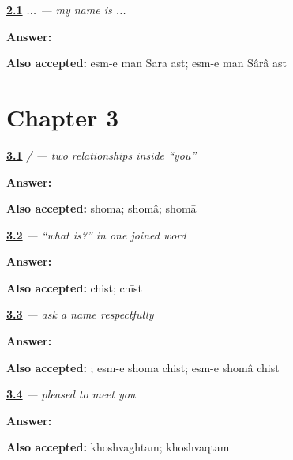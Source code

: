 \noindent\begin{minipage}[t]{\linewidth}
\raggedright
\hyperlink{review-FA-C02-esm-e-man-sara}{\textbf{2.1}} \emph{  ...  — my name is ...}\par
\small \textbf{Answer:}    \par
\footnotesize \textbf{Also accepted:} esm-e man Sara ast; esm-e man Sârâ ast
\end{minipage}\par\medskip

\section*{Chapter 3}

\noindent\begin{minipage}[t]{\linewidth}
\raggedright
\hyperlink{review-FA-C03-shoma-to-first-meeting}{\textbf{3.1}} \emph{ /  — two relationships inside “you”}\par
\small \textbf{Answer:} \par
\footnotesize \textbf{Also accepted:} shoma; shomâ; shomā
\end{minipage}\par\medskip

\noindent\begin{minipage}[t]{\linewidth}
\raggedright
\hyperlink{review-FA-C03-chist-fusion}{\textbf{3.2}} \emph{ — “what is?” in one joined word}\par
\small \textbf{Answer:} \par
\footnotesize \textbf{Also accepted:} chist; chīst
\end{minipage}\par\medskip

\noindent\begin{minipage}[t]{\linewidth}
\raggedright
\hyperlink{review-FA-C03-esm-e-shoma-chist-question}{\textbf{3.3}} \emph{   — ask a name respectfully}\par
\small \textbf{Answer:}   \par
\footnotesize \textbf{Also accepted:}   ; esm-e shoma chist; esm-e shomâ chist
\end{minipage}\par\medskip

\noindent\begin{minipage}[t]{\linewidth}
\raggedright
\hyperlink{review-FA-C03-khoshvaghtam-close}{\textbf{3.4}} \emph{ — pleased to meet you}\par
\small \textbf{Answer:} \par
\footnotesize \textbf{Also accepted:} khoshvaghtam; khoshvaqtam
\end{minipage}\par\medskip

